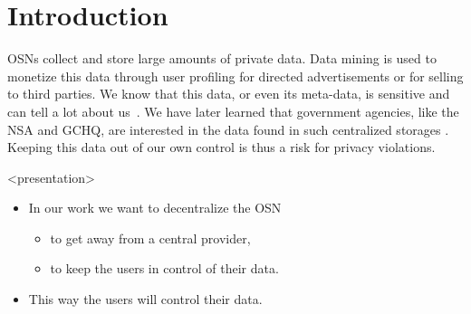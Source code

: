 \acresetall{}
\section{Introduction}
%

\acp{OSN} collect and store large amounts of private data.
Data mining is used to monetize this data through user profiling for directed 
advertisements or for selling to third parties.
We know that this data, or even its meta-data, is sensitive and can tell a lot 
about us~\cite[e.g.][]{pregnancy}.
We have later learned that government agencies, like the \ac{NSA} and 
\ac{GCHQ}, are interested in the data found in such centralized storages 
\cite{prism}.
Keeping this data out of our own control is thus a risk for privacy violations.


\begin{frame}<presentation>
  \begin{itemize}

    \item In our work we want to decentralize the \ac{OSN}
      \begin{itemize}
        \item to get away from a central provider,
        \item to keep the users in control of their data.
      \end{itemize}

    \item This way the users will control their data.


  \end{itemize}
\end{frame}


